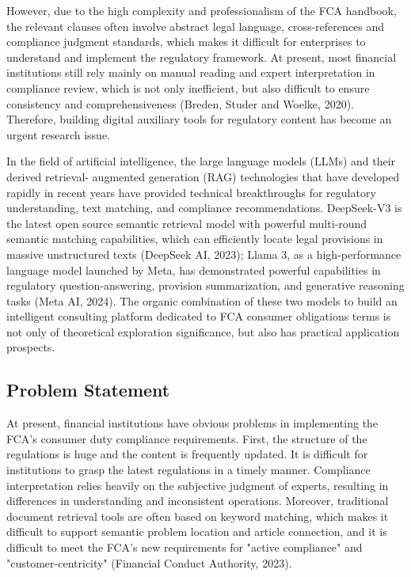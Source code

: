 \documentclass[a4paper,11pt]{article}
\begin{document}
However, due to the high complexity and professionalism of the FCA handbook, the relevant clauses often involve abstract legal language, cross-references and compliance judgment standards, which makes it difficult for enterprises to understand and implement the regulatory framework. At present, most financial institutions still rely mainly on manual reading and expert interpretation in compliance review, which is not only inefficient, but also difficult to ensure consistency and comprehensiveness (Breden, Studer and Woelke, 2020). Therefore, building digital auxiliary tools for regulatory content has become an urgent research issue.

In the field of artificial intelligence, the large language models (LLMs) and their derived retrieval-
augmented generation (RAG) technologies that have developed rapidly in recent years have provided technical breakthroughs for regulatory understanding, text matching, and compliance recommendations. DeepSeek-V3 is the latest open source semantic retrieval model with powerful multi-round semantic matching capabilities, which can efficiently locate legal provisions in massive unstructured texts (DeepSeek AI, 2023); Llama 3, as a high-performance language model launched by Meta, has demonstrated powerful capabilities in regulatory question-answering, provision summarization, and generative reasoning tasks (Meta AI, 2024). The organic combination of these two models to build an intelligent consulting platform dedicated to FCA consumer obligations terms is not only of theoretical exploration significance, but also has practical application prospects.

\subsection{Problem Statement}

At present, financial institutions have obvious problems in implementing the FCA's consumer duty compliance requirements. First, the structure of the regulations is huge and the content is frequently updated. It is difficult for institutions to grasp the latest regulations in a timely manner. Compliance interpretation relies heavily on the subjective judgment of experts, resulting in differences in understanding and inconsistent operations. Moreover, traditional document retrieval tools are often based on keyword matching, which makes it difficult to support semantic problem location and article connection, and it is difficult to meet the FCA's new requirements for "active compliance" and "customer-centricity" (Financial Conduct Authority, 2023).
\end{document}
